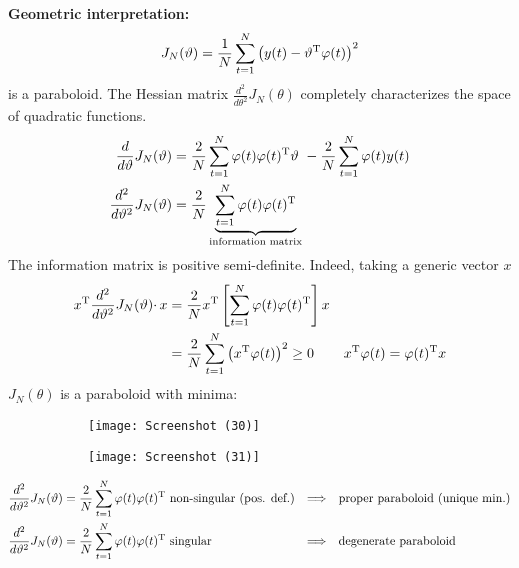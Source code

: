 \textbf{Geometric interpretation:}
\begin{equation*}
J_{N}(\vartheta) =\frac{1}{N}\sum _{t=1}^{N}\left(y(t) -\vartheta ^{\mathrm{T}} \varphi (t)\right)^{2}
\end{equation*}
is a paraboloid. The Hessian matrix $ \frac{d^{2}}{d\theta ^{2}} J_{N}(\theta)$ completely characterizes the space of quadratic functions.
\begin{align*}
\frac{d}{d\vartheta } J_{N}(\vartheta) & =\frac{2}{N}\sum _{t=1}^{N} \varphi (t) \varphi (t)^{\mathrm{T}} \vartheta \ -\frac{2}{N}\sum _{t=1}^{N} \varphi (t) y(t)\\
\frac{d^{2}}{d\vartheta ^{2}} J_{N}(\vartheta) & =\frac{2}{N}\underbrace{\sum _{t=1}^{N} \varphi (t) \varphi (t)^{\mathrm{T}}}_{\text{information matrix}}
\end{align*}
The information matrix is positive semi-definite. Indeed, taking a generic vector $x$
\begin{align*}
x^{\mathrm{T}}\frac{d^{2}}{d\vartheta ^{2}} J_{N}(\vartheta) \cdotp x & =\frac{2}{N} x^{\mathrm{T}}\left[\sum _{t=1}^{N} \varphi (t) \varphi (t)^{\mathrm{T}}\right] x & \\
 & =\frac{2}{N}\sum _{t=1}^{N}\left(x^{\mathrm{T}} \varphi (t)\right)^{2} \geq 0 & x^{\mathrm{T}} \varphi (t) =\varphi (t)^{\mathrm{T}} x
\end{align*}
$ J_{N}(\theta)$ is a paraboloid with minima:
\begin{figure}[htpb]
	\centering
	\begin{subfigure}{.5\textwidth}
		\centering
		\texttt{[image: Screenshot (30)]}
		\label{fig:test1}
	\end{subfigure}%
	\begin{subfigure}{.5\textwidth}
		\centering
		\texttt{[image: Screenshot (31)]}
		\label{fig:test2}
	\end{subfigure}
\end{figure}
\FloatBarrier
\begin{align*}
\frac{d^{2}}{d\vartheta ^{2}} J_{N}(\vartheta) & =\frac{2}{N}\sum _{t=1}^{N} \varphi (t) \varphi (t)^{\mathrm{T}} \text{ non-singular (pos. def.)} & \Longrightarrow\quad& \text{proper paraboloid (unique min.)}\\
\frac{d^{2}}{d\vartheta ^{2}} J_{N}(\vartheta) & =\frac{2}{N}\sum _{t=1}^{N} \varphi (t) \varphi (t)^{\mathrm{T}} \text{ singular} &\Longrightarrow\quad& \text{degenerate paraboloid}
\end{align*}